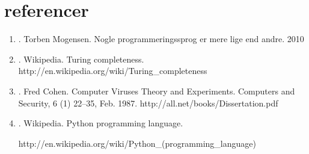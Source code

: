 \documentclass[12pt]{article}
\begin{document}
\section{referencer}
\begin{enumerate}
\item. Torben Mogensen. Nogle programmeringssprog er mere lige end andre. 2010
\item. Wikipedia. Turing completeness.
http://en.wikipedia.org/wiki/Turing\_completeness
\item. Fred Cohen. Computer Viruses Theory and Experiments. Computers and
Security, 6 (1) 22–35, Feb. 1987. http://all.net/books/Dissertation.pdf
\item. Wikipedia. Python programming language.

http://en.wikipedia.org/wiki/Python\_(programming\_language)
\end{enumerate}
\end{document}
